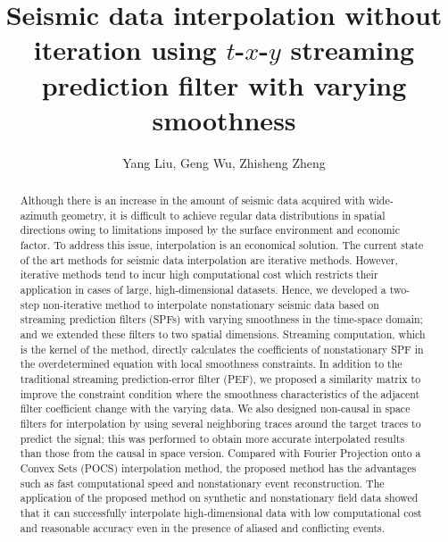 
\title{Seismic data interpolation without iteration using $t$-$x$-$y$ streaming prediction filter with varying smoothness}

\renewcommand{\thefootnote}{\fnsymbol{footnote}}


\address{
\footnotemark[1] College of Geo-exploration Science and Technology,\\
Jilin University \\ No.938 Xi minzhu street, \\ Changchun, China,
130026}

\author{Yang Liu\footnotemark[1], Geng Wu\footnotemark[1], Zhisheng Zheng\footnotemark[1]}


\maketitle

\begin{abstract}

Although there is an increase in the amount of seismic data acquired
with wide-azimuth geometry, it is difficult to achieve regular data
distributions in spatial directions owing to limitations imposed by
the surface environment and economic factor. To address this issue,
interpolation is an economical solution.  The current state of the art
methods for seismic data interpolation are iterative methods.
However, iterative methods tend to incur high computational cost which
restricts their application in cases of large, high-dimensional
datasets. Hence, we developed a two-step non-iterative method to
interpolate nonstationary seismic data based on streaming prediction
filters (SPFs) with varying smoothness in the time-space domain; and
we extended these filters to two spatial dimensions.  Streaming
computation, which is the kernel of the method, directly calculates
the coefficients of nonstationary SPF in the overdetermined equation
with local smoothness constraints.  In addition to the traditional
streaming prediction-error filter (PEF), we proposed a similarity
matrix to improve the constraint condition where the smoothness
characteristics of the adjacent filter coefficient change with the
varying data. We also designed non-causal in space filters for
interpolation by using several neighboring traces around the target
traces to predict the signal; this was performed to obtain more
accurate interpolated results than those from the causal in space
version.  Compared with Fourier Projection onto a Convex Sets (POCS)
interpolation method, the proposed method has the advantages such as
fast computational speed and nonstationary event reconstruction.  The
application of the proposed method on synthetic and nonstationary
field data showed that it can successfully interpolate
high-dimensional data with low computational cost and reasonable
accuracy even in the presence of aliased and conflicting events.

\end{abstract}
\clearpage

